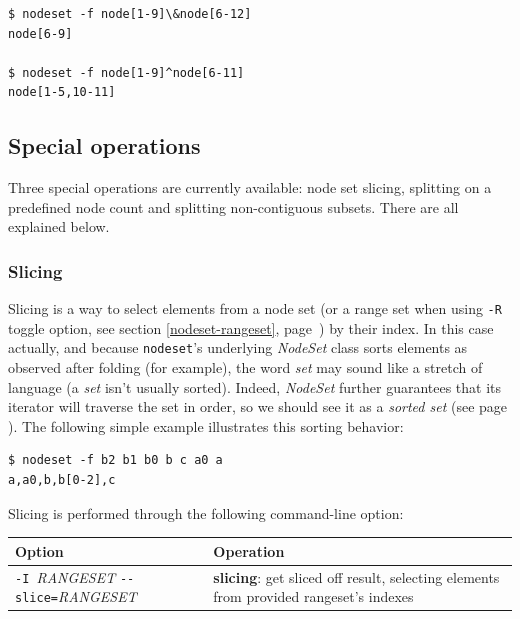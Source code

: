 \documentclass[english,a4paper]{csuserguide}
\newcommand{\nodeset}{\texttt{nodeset}\xspace}
\begin{document}
\begin{lstlisting}[breaklines=true, breakatwhitespace=true]
$ nodeset -f node[1-9]\&node[6-12]
node[6-9]

$ nodeset -f node[1-9]^node[6-11]
node[1-5,10-11]
\end{lstlisting}

\subsection{Special operations}
\label{nodeset-special}

Three special operations are currently available: node set slicing, splitting on a predefined node count and splitting non-contiguous subsets. There are all explained below.

\subsubsection{Slicing}
\label{nodeset-slice}

Slicing is a way to select elements from a node set (or a range set when using \verb+-R+ toggle option, see section \ref{nodeset-rangeset}, page~\pageref{nodeset-rangeset}) by their index. In this case actually, and because \nodeset's underlying \textit{NodeSet} class sorts elements as observed after folding (for example), the word \textit{set} may sound like a stretch of language (a \textit{set} isn't usually sorted). Indeed, \textit{NodeSet} further guarantees that its iterator will traverse the set in order, so we should see it as a \textit{sorted set} (see page \pageref{class-NodeSet}).  The following simple example illustrates this sorting behavior:

\medskip
\begin{lstlisting}[breaklines=true, breakatwhitespace=true]
$ nodeset -f b2 b1 b0 b c a0 a
a,a0,b,b[0-2],c
\end{lstlisting}

Slicing is performed through the following command-line option:
\begin{center}
\begin{tabular}{|p{5.4cm}|p{11.4cm}|} 
\hline 
\textbf{Option} & \textbf{Operation} \\
\hline
\verb+-I +\textit{RANGESET} \verb+--slice=+\textit{RANGESET}& \textbf{slicing}: get sliced off result, selecting elements from provided rangeset's indexes\\
\hline
\end{tabular}
\end{center}
\end{document}
